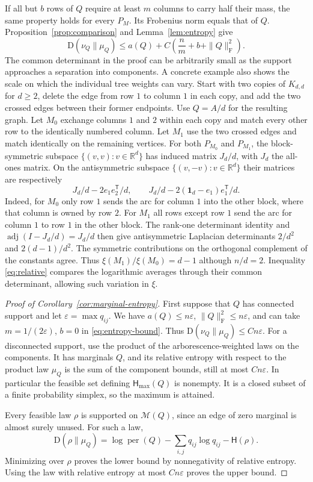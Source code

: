 \documentclass[11pt]{article}
\DeclareMathOperator{\per}{per}
\newcommand{\one}{\mathbf{1}}
\newcommand{\KL}{\mathrm{D}}
\newcommand{\Ent}{\mathsf{H}}
\newcommand{\Frob}{\mathrm{F}}
\newcommand{\trans}{\mathsf{T}}
\newcommand{\cM}{\mathcal{M}}
\begin{document}
If all but \(b\) rows of \(Q\) require at least \(m\) columns to carry half their mass, the same property holds for every \(P_M\). Its Frobenius norm equals that of \(Q\). Proposition~\ref{prop:comparison} and Lemma~\ref{lem:entropy} give
\begin{equation}\label{eq:entropy-bound}
 \KL(\nu_Q\|\mu_Q)\le
 a(Q)+C\left(\frac{n}{m}+b+\|Q\|_{\Frob}^2\right).
\end{equation}
The common determinant in the proof can be arbitrarily small as the support approaches a separation into components. A concrete example also shows the scale on which the individual tree weights can vary. Start with two copies of \(K_{d,d}\) for \(d\ge2\), delete the edge from row \(1\) to column \(1\) in each copy, and add the two crossed edges between their former endpoints. Use \(Q=A/d\) for the resulting graph. Let \(M_0\) exchange columns \(1\) and \(2\) within each copy and match every other row to the identically numbered column. Let \(M_1\) use the two crossed edges and match identically on the remaining vertices. For both \(P_{M_0}\) and \(P_{M_1}\), the block-symmetric subspace \(\{(v,v):v\in\mathbb R^d\}\) has induced matrix \(J_d/d\), with \(J_d\) the all-ones matrix. On the antisymmetric subspace \(\{(v,-v):v\in\mathbb R^d\}\) their matrices are respectively
\[
 J_d/d-2e_1e_2^{\trans}/d,\qquad
 J_d/d-2(\one_d-e_1)e_1^{\trans}/d.
\]
Indeed, for \(M_0\) only row \(1\) sends the arc for column \(1\) into the other block, where that column is owned by row \(2\). For \(M_1\) all rows except row \(1\) send the arc for column \(1\) to row \(1\) in the other block. The rank-one determinant identity and \(\operatorname{adj}(I-J_d/d)=J_d/d\) then give antisymmetric Laplacian determinants \(2/d^2\) and \(2(d-1)/d^2\). The symmetric contributions on the orthogonal complement of the constants agree. Thus \(\xi(M_1)/\xi(M_0)=d-1\) although \(n/d=2\). Inequality \eqref{eq:relative} compares the logarithmic averages through their common determinant, allowing such variation in \(\xi\).

\begin{proof}[Proof of Corollary~\ref{cor:marginal-entropy}]
First suppose that \(Q\) has connected support and let \(\varepsilon=\max q_{ij}\). We have \(a(Q)\le n\varepsilon\), \(\|Q\|_{\Frob}^2\le n\varepsilon\), and can take \(m=1/(2\varepsilon)\), \(b=0\) in \eqref{eq:entropy-bound}. Thus \(\KL(\nu_Q\|\mu_Q)\le Cn\varepsilon\). For a disconnected support, use the product of the arborescence-weighted laws on the components. It has marginals \(Q\), and its relative entropy with respect to the product law \(\mu_Q\) is the sum of the component bounds, still at most \(Cn\varepsilon\). In particular the feasible set defining \(\Ent_{\max}(Q)\) is nonempty. It is a closed subset of a finite probability simplex, so the maximum is attained.

Every feasible law \(\rho\) is supported on \(\cM(Q)\), since an edge of zero marginal is almost surely unused. For such a law,
\[
 \KL(\rho\|\mu_Q)=\log\per(Q)-\sum_{i,j}q_{ij}\log q_{ij}-\Ent(\rho).
\]
Minimizing over \(\rho\) proves the lower bound by nonnegativity of relative entropy. Using the law with relative entropy at most \(Cn\varepsilon\) proves the upper bound.
\end{proof}
\end{document}
